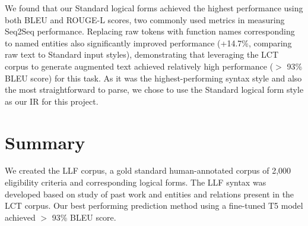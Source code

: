 \documentclass[../main.tex]{subfiles}
\begin{document}
We found that our Standard logical forms achieved the highest performance using both BLEU \cite{lin2004rouge} and ROUGE-L \cite{callison2006re} scores, two commonly used metrics in measuring Seq2Seq performance. Replacing raw tokens with function names corresponding to named entities also significantly improved performance (+14.7\%, comparing raw text to Standard input styles), demonstrating that leveraging the LCT corpus to generate augmented text achieved relatively high performance ($>$ 93\% BLEU score) for this task. As it was the highest-performing syntax style and also the most straightforward to parse, we chose to use the Standard logical form style as our IR for this project.

\section{Summary}
We created the LLF corpus, a gold standard human-annotated corpus of 2,000 eligibility criteria and corresponding logical forms. The LLF syntax was developed based on study of past work and entities and relations present in the LCT corpus. Our best performing prediction method using a fine-tuned T5 model achieved $>$ 93\% BLEU score.
\end{document}
